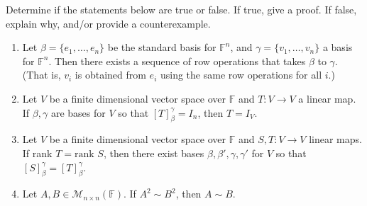 \documentclass{eh-homework}
\begin{document}
    \begin{question}{13}
        Determine if the statements below are true or false. If true, give a proof. If false, explain why, and/or provide a counterexample.

        \begin{enumerate}
            \item Let \( \beta = \{ e_1, \ldots, e_n \} \) be the standard basis for \( \mathbb{F}^n \), and \( \gamma = \{ v_1, \ldots, v_n \} \) a basis for \( \mathbb{F}^n \). Then there exists a sequence of row operations that takes \( \beta \) to \( \gamma \). (That is, \( v_i \) is obtained from \( e_i \) using the same row operations for all \( i \).)
            \item Let \( V \) be a finite dimensional vector space over \( \mathbb{F} \) and \( T : V \to V \) a linear map. If \( \beta, \gamma \) are bases for \( V \) so that \( [T]_\beta^\gamma = I_n \), then \( T = I_V \).
            \item Let \( V \) be a finite dimensional vector space over \( \mathbb{F} \) and \( S, T : V \to V \) linear maps. If rank \( T = \text{rank } S \), then there exist bases \( \beta, \beta', \gamma, \gamma' \) for \( V \) so that \( [S]_\beta^\gamma = [T]_\beta^\gamma \).
            \item Let \( A, B \in \mathcal{M}_{n \times n}(\mathbb{F}) \). If \( A^2 \sim B^2 \), then \( A \sim B \).
        \end{enumerate}
    \end{question}
\end{document}
